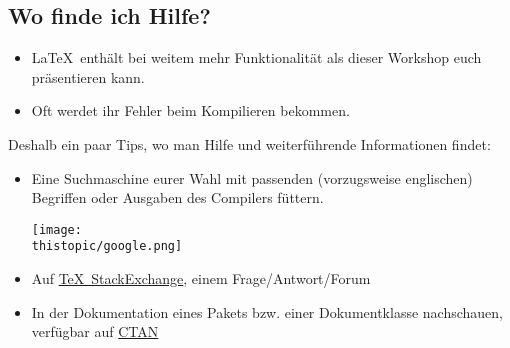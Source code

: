 \subsection{Wo finde ich Hilfe?}

\begin{frame}{\subsecname}
    \begin{itemize}
        \item \LaTeX\ enthält bei weitem mehr Funktionalität als dieser Workshop euch präsentieren
            kann.
        \item Oft werdet ihr Fehler beim Kompilieren bekommen.
    \end{itemize}
    Deshalb ein paar Tips, wo man Hilfe und weiterführende Informationen findet:
    \begin{itemize}
        \item Eine \alert{Suchmaschine} eurer Wahl mit passenden (vorzugsweise englischen) Begriffen
            oder Ausgaben des Compilers füttern.
            \begin{center}
                \texttt{[image: \\thistopic/google.png]}
            \end{center}
        \item Auf \href{https://tex.stackexchange.com}{\alert{\TeX~StackExchange}}, einem
            Frage\-/Antwort\-/Forum
        \item In der \alert{Dokumentation} eines Pakets bzw. einer Dokumentklasse nachschauen,
            verfügbar auf \href{https://ctan.org}{CTAN}
    \end{itemize}
\end{frame}
